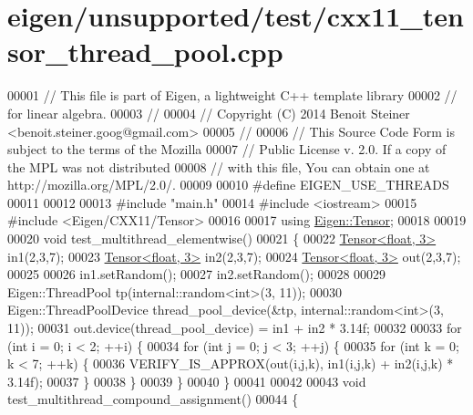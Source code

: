 \hypertarget{eigen_2unsupported_2test_2cxx11__tensor__thread__pool_8cpp_source}{}\section{eigen/unsupported/test/cxx11\+\_\+tensor\+\_\+thread\+\_\+pool.cpp}
\label{eigen_2unsupported_2test_2cxx11__tensor__thread__pool_8cpp_source}

\begin{DoxyCode}
00001 \textcolor{comment}{// This file is part of Eigen, a lightweight C++ template library}
00002 \textcolor{comment}{// for linear algebra.}
00003 \textcolor{comment}{//}
00004 \textcolor{comment}{// Copyright (C) 2014 Benoit Steiner <benoit.steiner.goog@gmail.com>}
00005 \textcolor{comment}{//}
00006 \textcolor{comment}{// This Source Code Form is subject to the terms of the Mozilla}
00007 \textcolor{comment}{// Public License v. 2.0. If a copy of the MPL was not distributed}
00008 \textcolor{comment}{// with this file, You can obtain one at http://mozilla.org/MPL/2.0/.}
00009 
00010 \textcolor{preprocessor}{#define EIGEN\_USE\_THREADS}
00011 
00012 
00013 \textcolor{preprocessor}{#include "main.h"}
00014 \textcolor{preprocessor}{#include <iostream>}
00015 \textcolor{preprocessor}{#include <Eigen/CXX11/Tensor>}
00016 
00017 \textcolor{keyword}{using} \hyperlink{class_eigen_1_1_tensor}{Eigen::Tensor};
00018 
00019 
00020 \textcolor{keywordtype}{void} test\_multithread\_elementwise()
00021 \{
00022   \hyperlink{class_eigen_1_1_tensor}{Tensor<float, 3>} in1(2,3,7);
00023   \hyperlink{class_eigen_1_1_tensor}{Tensor<float, 3>} in2(2,3,7);
00024   \hyperlink{class_eigen_1_1_tensor}{Tensor<float, 3>} out(2,3,7);
00025 
00026   in1.setRandom();
00027   in2.setRandom();
00028 
00029   Eigen::ThreadPool tp(internal::random<int>(3, 11));
00030   Eigen::ThreadPoolDevice thread\_pool\_device(&tp, internal::random<int>(3, 11));
00031   out.device(thread\_pool\_device) = in1 + in2 * 3.14f;
00032 
00033   \textcolor{keywordflow}{for} (\textcolor{keywordtype}{int} i = 0; i < 2; ++i) \{
00034     \textcolor{keywordflow}{for} (\textcolor{keywordtype}{int} j = 0; j < 3; ++j) \{
00035       \textcolor{keywordflow}{for} (\textcolor{keywordtype}{int} k = 0; k < 7; ++k) \{
00036         VERIFY\_IS\_APPROX(out(i,j,k), in1(i,j,k) + in2(i,j,k) * 3.14f);
00037       \}
00038     \}
00039   \}
00040 \}
00041 
00042 
00043 \textcolor{keywordtype}{void} test\_multithread\_compound\_assignment()
00044 \{

\end{DoxyCode}
